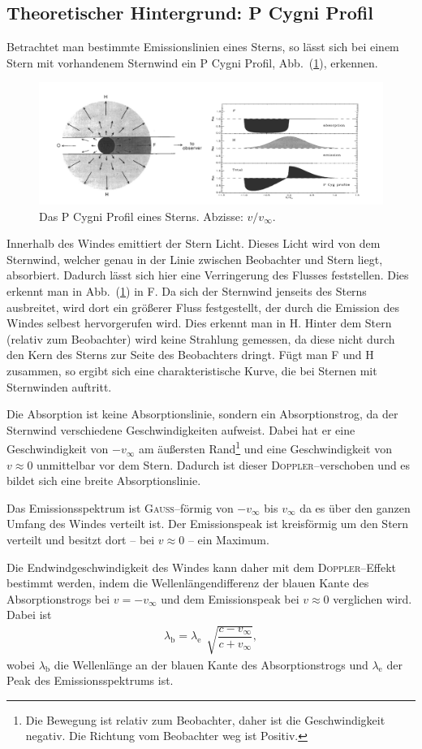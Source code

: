\subsection{Theoretischer Hintergrund: P Cygni Profil} \label{sec:T-H-P-Cygni}
Betrachtet man bestimmte Emissionslinien eines Sterns, so lässt sich bei einem Stern mit vorhandenem Sternwind ein P Cygni Profil, Abb.\ (\ref{fig:p_cygni_profil}), erkennen.
\begin{figure}[t]
  \centering
  \includegraphics[width=.5\textwidth]{464_p_cygni_profil.png}
  \caption{Das P Cygni Profil eines Sterns. Abzisse: $v/v_\infty$.\cite{anleitung464}} \label{fig:p_cygni_profil}
\end{figure}

Innerhalb des Windes emittiert der Stern Licht.
Dieses Licht wird von dem Sternwind, welcher genau in der Linie zwischen Beobachter und Stern liegt, absorbiert.
Dadurch lässt sich hier eine Verringerung des Flusses feststellen.
Dies erkennt man in Abb.\ (\ref{fig:p_cygni_profil}) in F.
Da sich der Sternwind jenseits des Sterns ausbreitet, wird dort ein größerer Fluss festgestellt, der durch die Emission des Windes selbest hervorgerufen wird.
Dies erkennt man in H.
Hinter dem Stern (relativ zum Beobachter) wird keine Strahlung gemessen, da diese nicht durch den Kern des Sterns zur Seite des Beobachters dringt.
Fügt man F und H zusammen, so ergibt sich eine charakteristische Kurve, die bei Sternen mit Sternwinden auftritt.

Die Absorption ist keine Absorptionslinie, sondern ein Absorptionstrog, da der Sternwind verschiedene Geschwindigkeiten aufweist.
Dabei hat er eine Geschwindigkeit von $-v_\infty$ am äußersten Rand\footnote{Die Bewegung ist relativ zum Beobachter, daher ist die Geschwindigkeit negativ. Die Richtung vom Beobachter weg ist Positiv.} und eine Geschwindigkeit von $v\approx 0$ unmittelbar vor dem Stern. %
Dadurch ist dieser \textsc{Doppler}--verschoben und es bildet sich eine breite Absorptionslinie.

Das Emissionsspektrum ist \textsc{Gauss}--förmig von $-v_\infty$ bis $v_\infty$ da es über den ganzen Umfang des Windes verteilt ist.
Der Emissionspeak ist kreisförmig um den Stern verteilt und besitzt dort -- bei $v\approx 0$ -- ein Maximum.

Die Endwindgeschwindigkeit des Windes kann daher mit dem \textsc{Doppler}--Effekt bestimmt werden, indem die Wellenlängendifferenz der blauen Kante des Absorptionstrogs bei $v=-v_\infty$ und dem Emissionspeak bei $v\approx 0$ verglichen wird.
Dabei ist
\begin{align} 
  \lambda _\text{b}=\lambda _\text{e}\,\sqrt[]{\dfrac{c-v_\infty}{c+v_\infty}}
,\end{align} 
wobei $\lambda _\text{b}$ die Wellenlänge an der blauen Kante des Absorptionstrogs und $\lambda _\text{e}$ der Peak des Emissionsspektrums ist.
